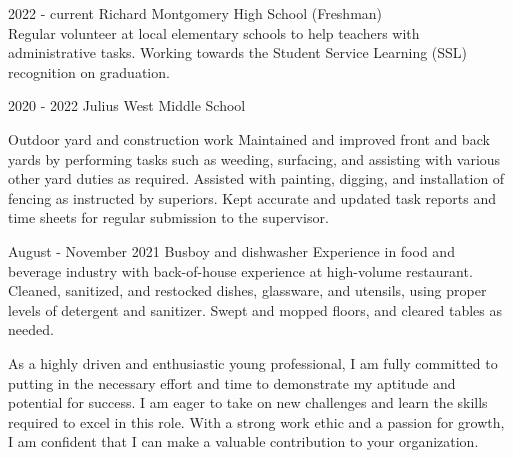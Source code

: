 \documentclass[]{scrartcl}
\begin{document}
\begin{cleanCV}

  \vspace{-0.50em}

\WorkExperience
{2022 - current}
{Richard Montgomery High School (Freshman)\\}
{Regular volunteer at local elementary schools to help teachers with administrative tasks. Working towards the Student Service Learning (SSL) recognition on graduation. }
\vspace{-0.5em}

\WorkExperience
{2020 - 2022}
{Julius West Middle School}{}
\vspace{-0.5em}


\vspace{0.50em}

{Outdoor yard and construction work}
{}
        {Maintained and improved front and back yards by performing tasks such as weeding, surfacing, and assisting with various other yard duties as required. Assisted with painting, digging, and installation of fencing as instructed by superiors. Kept accurate and updated task reports and time sheets for regular submission to the supervisor.}

\WorkExperience
{August - November 2021}
{Busboy and dishwasher}
{}
        {
          Experience in food and beverage industry with back-of-house experience at high-volume restaurant.
          Cleaned, sanitized, and restocked dishes, glassware, and utensils, using proper levels of detergent and sanitizer.
          Swept and mopped floors, and cleared tables as needed.
}

\vspace{-1.50em}

\WorkExperience
{}
{}
{}
\JobDesc{}
        {As a highly driven and enthusiastic young professional, I am fully committed to putting in the necessary effort and time to demonstrate my aptitude and potential for success. I am eager to take on new challenges and learn the skills required to excel in this role. With a strong work ethic and a passion for growth, I am confident that I can make a valuable contribution to your organization. }

\pagebreak

\end{cleanCV}
\end{document}
